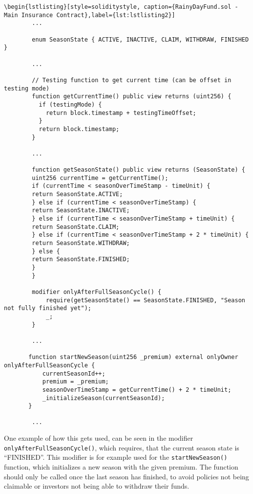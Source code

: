 \documentclass[11pt,a4paper]{article}
\begin{document}
\begin{lstlisting}[style=soliditystyle, caption={RainyDayFund.sol - Main Insurance Contract},label={lst:lstlisting1}]
    \begin{lstlisting}[style=soliditystyle, caption={RainyDayFund.sol - Main Insurance Contract},label={lst:lstlisting2}]
        ...

        enum SeasonState { ACTIVE, INACTIVE, CLAIM, WITHDRAW, FINISHED }

        ...

        // Testing function to get current time (can be offset in testing mode)
        function getCurrentTime() public view returns (uint256) {
          if (testingMode) {
            return block.timestamp + testingTimeOffset;
          }
          return block.timestamp;
        }

        ...

        function getSeasonState() public view returns (SeasonState) {
        uint256 currentTime = getCurrentTime();
        if (currentTime < seasonOverTimeStamp - timeUnit) {
        return SeasonState.ACTIVE;
        } else if (currentTime < seasonOverTimeStamp) {
        return SeasonState.INACTIVE;
        } else if (currentTime < seasonOverTimeStamp + timeUnit) {
        return SeasonState.CLAIM;
        } else if (currentTime < seasonOverTimeStamp + 2 * timeUnit) {
        return SeasonState.WITHDRAW;
        } else {
        return SeasonState.FINISHED;
        }
        }

        modifier onlyAfterFullSeasonCycle() {
            require(getSeasonState() == SeasonState.FINISHED, "Season not fully finished yet");
            _;
        }

        ...

       function startNewSeason(uint256 _premium) external onlyOwner onlyAfterFullSeasonCycle {
           currentSeasonId++;
           premium = _premium;
           seasonOverTimeStamp = getCurrentTime() + 2 * timeUnit;
           _initializeSeason(currentSeasonId);
       }

        ...
    \end{lstlisting}

    One example of how this gets used, can be seen in the modifier \texttt{onlyAfterFullSeasonCycle()}, which requires, that the current season state is \enquote{FINISHED}.
    This modifier is for example used for the \texttt{startNewSeason()} function, which initializes a new season with the given premium.
    The function should only be called once the last season has finished, to avoid policies not being claimable or investors not being able to withdraw their funds.
\end{document}
